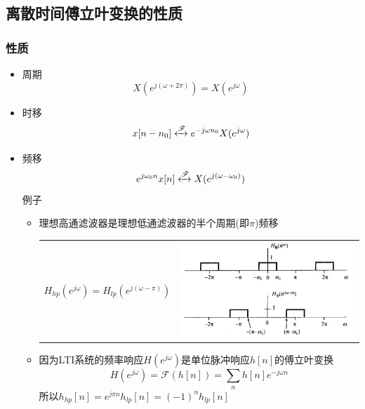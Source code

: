 \documentclass[CJKutf8,xcolor=pdftex,dvipsnames,table]{beamer}
\begin{document}
\begin{CJK*}{UTF8}{song}
	\section{离散时间傅立叶变换的性质}

  \begin{frame}
    \frametitle{性质}
    \begin{itemize}
    \item 周期
    \[
    	X(e^{j(\omega+2\pi)})=X(e^{j\omega})
	\]
    \item 时移
    \[
    	x[n-n_0] \xleftrightarrow{\mathscr{F}} e^{-j\omega n_0}X(e^{j\omega})
	\]
    \item 频移
    \[
    	e^{j\omega_0 n}x[n] \xleftrightarrow{\mathscr{F}} X(e^{j(\omega-\omega_0)})
	\]	
	例子
    	\begin{itemize}
    	\item 理想高通滤波器是理想低通滤波器的半个周期(即$\pi$)频移 \\
	\begin{tabular}{ll}
	\raisebox{-.5\height}

$H_{hp}(e^{j\omega})=H_{lp}(e^{j(\omega-\pi)})$

&
    \includegraphics[valign=m,scale=.28]{ss-c-f5-12}    \\
    \end{tabular}  
    	
		\item 因为LTI系统的频率响应$H(e^{j\omega})$是单位脉冲响应$h[n]$的傅立叶变换
		\[
			H(e^{j\omega})=\mathscr{F}(h[n])=\sum_n h[n]e^{-j\omega n}
		\]
		所以$h_{hp}[n]=e^{j\pi n}h_{lp}[n]=(-1)^nh_{lp}[n]$
		
    	\end{itemize}
	
	\end{itemize}
  \end{frame}   
  	 

\end{CJK*}
\end{document}
